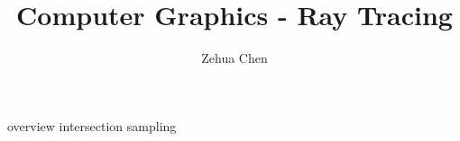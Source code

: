 \documentclass[letterpaper, 11pt]{report}
\title{Computer Graphics - Ray Tracing}
\author{Zehua Chen}
\begin{document}
  \maketitle
  \tableofcontents

  {overview}
  {intersection}
  {sampling}

  \newpage
  \printglossary
\end{document}
